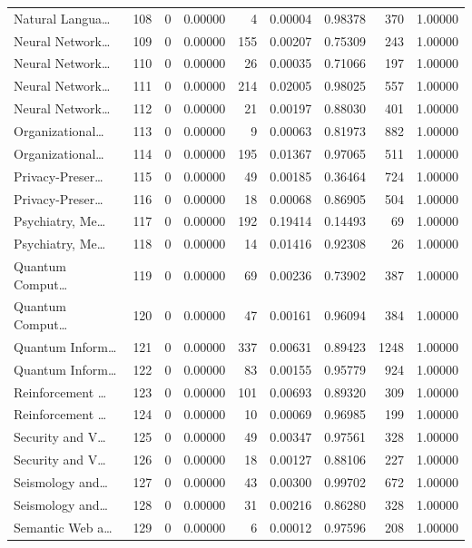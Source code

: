\begin{table}
\begin{tabular}{lrrrrrrrr}
Natural Langua… & 108 & 0 & 0.00000 & 4 & 0.00004 & 0.98378 & 370 & 1.00000 \\
Neural Network… & 109 & 0 & 0.00000 & 155 & 0.00207 & 0.75309 & 243 & 1.00000 \\
Neural Network… & 110 & 0 & 0.00000 & 26 & 0.00035 & 0.71066 & 197 & 1.00000 \\
Neural Network… & 111 & 0 & 0.00000 & 214 & 0.02005 & 0.98025 & 557 & 1.00000 \\
Neural Network… & 112 & 0 & 0.00000 & 21 & 0.00197 & 0.88030 & 401 & 1.00000 \\
Organizational… & 113 & 0 & 0.00000 & 9 & 0.00063 & 0.81973 & 882 & 1.00000 \\
Organizational… & 114 & 0 & 0.00000 & 195 & 0.01367 & 0.97065 & 511 & 1.00000 \\
Privacy-Preser… & 115 & 0 & 0.00000 & 49 & 0.00185 & 0.36464 & 724 & 1.00000 \\
Privacy-Preser… & 116 & 0 & 0.00000 & 18 & 0.00068 & 0.86905 & 504 & 1.00000 \\
Psychiatry, Me… & 117 & 0 & 0.00000 & 192 & 0.19414 & 0.14493 & 69 & 1.00000 \\
Psychiatry, Me… & 118 & 0 & 0.00000 & 14 & 0.01416 & 0.92308 & 26 & 1.00000 \\
Quantum Comput… & 119 & 0 & 0.00000 & 69 & 0.00236 & 0.73902 & 387 & 1.00000 \\
Quantum Comput… & 120 & 0 & 0.00000 & 47 & 0.00161 & 0.96094 & 384 & 1.00000 \\
Quantum Inform… & 121 & 0 & 0.00000 & 337 & 0.00631 & 0.89423 & 1248 & 1.00000 \\
Quantum Inform… & 122 & 0 & 0.00000 & 83 & 0.00155 & 0.95779 & 924 & 1.00000 \\
Reinforcement … & 123 & 0 & 0.00000 & 101 & 0.00693 & 0.89320 & 309 & 1.00000 \\
Reinforcement … & 124 & 0 & 0.00000 & 10 & 0.00069 & 0.96985 & 199 & 1.00000 \\
Security and V… & 125 & 0 & 0.00000 & 49 & 0.00347 & 0.97561 & 328 & 1.00000 \\
Security and V… & 126 & 0 & 0.00000 & 18 & 0.00127 & 0.88106 & 227 & 1.00000 \\
Seismology and… & 127 & 0 & 0.00000 & 43 & 0.00300 & 0.99702 & 672 & 1.00000 \\
Seismology and… & 128 & 0 & 0.00000 & 31 & 0.00216 & 0.86280 & 328 & 1.00000 \\
Semantic Web a… & 129 & 0 & 0.00000 & 6 & 0.00012 & 0.97596 & 208 & 1.00000 \\

\end{tabular}
\end{table}
